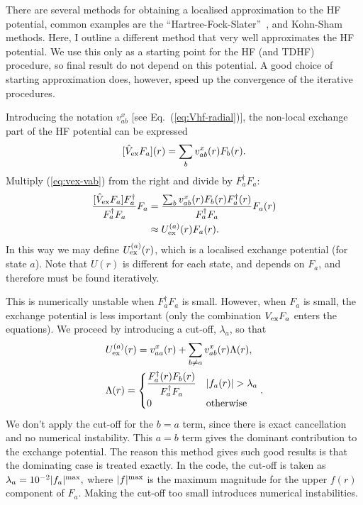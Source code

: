 \documentclass[10pt,twocolumn,a4paper]{article}%
\newcommand{\be}{\begin{equation}}
\newcommand{\ee}{\end{equation}}
\begin{document}
There are several methods for obtaining a localised approximation to the HF potential, common  examples are the ``Hartree-Fock-Slater''~\cite{Slater1951}, and Kohn-Sham methods.
%
Here, I outline a different method that very well approximates the HF potential. 
We use this only as a starting point for the HF (and TDHF) procedure, so final result do not depend on this potential. 
A good choice of starting approximation does, however, speed up the convergence of the iterative procedures.

Introducing the notation $v^x_{ab}$ [see Eq.~(\ref{eq:Vhf-radial})], the non-local exchange part of the HF potential can be expressed
\be\label{eq:vex-vab}
 [\hat V_{\rm ex}F_a](r) = \sum_b v^x_{ab}(r) F_b(r).
\ee
Multiply (\ref{eq:vex-vab}) from the right and divide  by $ F_a^\dag F_a$:
\begin{align}
 \frac{[\hat V_{\rm ex}F_a] F_a^\dag }{F_a^\dag F_a} F_a
&= \frac{\sum_b v^x_{ab}(r) F_b(r)F_a^\dag(r) }{F_a^\dag F_a} F_a(r)\\
&\approx U^{(a)}_{\rm ex}(r)F_a(r).
\end{align}
In this way we may define $U^{(a)}_{\rm ex}(r)$, which is a localised exchange potential (for state $a$).
Note that $U(r)$ is different for each state, and depends on $F_a$, and therefore must be found iteratively.

This is numerically unstable when $F_a^\dag F_a$ is small.
However, when $F_a$ is small, the exchange potential is less important (only the combination $V_{\rm ex}F_a$ enters the equations).
We proceed by introducing a cut-off, $\lambda_a$, so that
\begin{align}
& U^{(a)}_{\rm ex}(r) =  
v^x_{aa}(r) + \sum_{b\neq a} v^x_{ab}(r) \Lambda(r),
\\
&\Lambda(r) = 
\begin{cases}\dfrac{F_a^\dag(r) F_b(r)}{F_a^\dag F_a} & |f_a(r)|>\lambda_a\\
0&\mathrm{otherwise}
\end{cases}.
\end{align}
%
We don't apply the cut-off for the $b=a$ term, since there is exact cancellation and no numerical instability.
This $a=b$ term gives the dominant contribution to the exchange potential. 
The reason this method gives such good results is that the dominating case is treated exactly.
%
In the code, the cut-off is taken as
$
\lambda_{a} = 10^{-2} |f_a|^{\rm max},
$
where  $|f|^{\rm max}$ is the maximum magnitude for the upper $f(r)$ component of $F_a$.
Making the cut-off too small introduces numerical instabilities.
\end{document}
